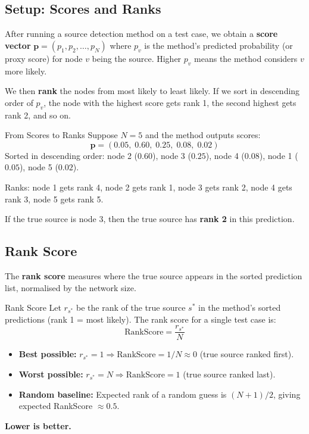 \subsection{Setup: Scores and Ranks}

After running a source detection method on a test case, we obtain a
\textbf{score vector} $\mathbf{p} = (p_1, p_2, \ldots, p_N)$ where $p_v$
is the method's predicted probability (or proxy score) for node $v$ being
the source. Higher $p_v$ means the method considers $v$ more likely.

We then \textbf{rank} the nodes from most likely to least likely. If we sort
in descending order of $p_v$, the node with the highest score gets rank 1,
the second highest gets rank 2, and so on.

\begin{examplebox}{From Scores to Ranks}
Suppose $N = 5$ and the method outputs scores:
\[
    \mathbf{p} = (0.05,\; 0.60,\; 0.25,\; 0.08,\; 0.02)
\]
Sorted in descending order: node 2 ($0.60$), node 3 ($0.25$), node 4
($0.08$), node 1 ($0.05$), node 5 ($0.02$).

Ranks: node 1 gets rank 4, node 2 gets rank 1, node 3 gets rank 2, node 4
gets rank 3, node 5 gets rank 5.

If the true source is node 3, then the true source has \textbf{rank 2} in
this prediction.
\end{examplebox}

\subsection{Rank Score}

The \textbf{rank score} measures where the true source appears in the sorted
prediction list, normalised by the network size.

\begin{mathbox}{Rank Score}
Let $r_{s^*}$ be the rank of the true source $s^*$ in the method's sorted
predictions (rank 1 = most likely). The rank score for a single test case is:
\begin{equation}
    \text{RankScore} = \frac{r_{s^*}}{N}
    \label{eq:rank-score}
\end{equation}
\begin{itemize}
    \item \textbf{Best possible:} $r_{s^*} = 1 \Rightarrow
    \text{RankScore} = 1/N \approx 0$ (true source ranked first).
    \item \textbf{Worst possible:} $r_{s^*} = N \Rightarrow
    \text{RankScore} = 1$ (true source ranked last).
    \item \textbf{Random baseline:} Expected rank of a random guess is
    $(N+1)/2$, giving expected RankScore $\approx 0.5$.
\end{itemize}
\textbf{Lower is better.}
\end{mathbox}

